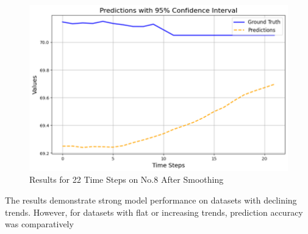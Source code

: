 \begin{figure}[h!]
	\centering
	\includegraphics[width=0.8\linewidth]{figures/22no8}
	\caption{Results for 22 Time Steps  on No.8 After Smoothing}
	\label{fig:22no8}
\end{figure}
The results demonstrate strong model performance on datasets with declining trends. However, for datasets with flat or increasing trends, prediction accuracy was comparatively
